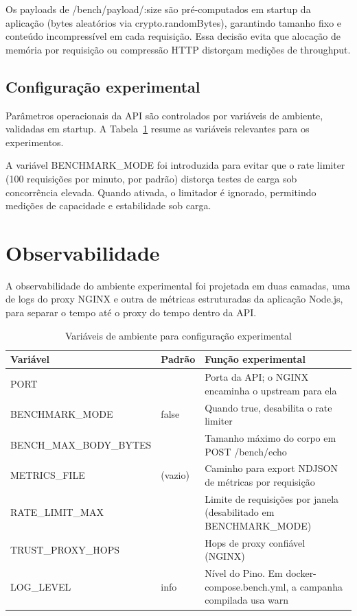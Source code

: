 Os payloads de /bench/payload/:size são pré-computados em startup da aplicação (bytes aleatórios via crypto.randomBytes), garantindo tamanho fixo e conteúdo incompressível em cada requisição. Essa decisão evita que alocação de memória por requisição ou compressão HTTP distorçam medições de throughput.

\subsection{Configuração experimental}

Parâmetros operacionais da API são controlados por variáveis de ambiente, validadas em startup. A Tabela~\ref{tab:variaveis-ambiente} resume as variáveis relevantes para os experimentos.

\begin{sloppypar}
A variável BENCHMARK\_MODE foi introduzida para evitar que o rate limiter (100 requisições por minuto, por padrão) distorça testes de carga sob concorrência elevada. Quando ativada, o limitador é ignorado, permitindo medições de capacidade e estabilidade sob carga.
\end{sloppypar}

\section{Observabilidade}

A observabilidade do ambiente experimental foi projetada em duas camadas, uma de logs do proxy NGINX e outra de métricas estruturadas da aplicação Node.js, para separar o tempo até o proxy do tempo dentro da API.

\begin{table}[htbp]
\centering
\caption{Variáveis de ambiente para configuração experimental}\label{tab:variaveis-ambiente}
\small
\setlength{\tabcolsep}{3pt}
\begin{tabular}{@{}>{\raggedright\arraybackslash}p{52mm}>{\raggedright\arraybackslash}p{18mm}>{\raggedright\arraybackslash}p{76mm}@{}}
\hline
Variável & Padrão & Função experimental \\
\hline
PORT & 3000 & Porta da API; o NGINX encaminha o upstream para ela \\
BENCHMARK\_\allowbreak MODE & false & Quando true, desabilita o rate limiter \\
BENCH\_\allowbreak MAX\_\allowbreak BODY\_\allowbreak BYTES & 2097152 & Tamanho máximo do corpo em POST /bench/echo \\
METRICS\_\allowbreak FILE & (vazio) & Caminho para export NDJSON de métricas por requisição \\
RATE\_\allowbreak LIMIT\_\allowbreak MAX & 100 & Limite de requisições por janela (desabilitado em BENCHMARK\_MODE) \\
TRUST\_\allowbreak PROXY\_\allowbreak HOPS & 1 & Hops de proxy confiável (NGINX) \\
LOG\_\allowbreak LEVEL & info & Nível do Pino. Em docker-compose.bench.yml, a campanha compilada usa warn \\
\hline
\end{tabular}
\end{table}

